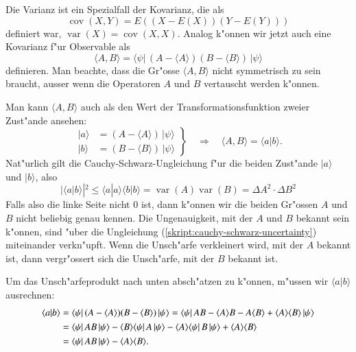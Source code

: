 Die Varianz ist ein Spezialfall der Kovarianz, die als 
\[
\operatorname{cov}(X,Y)
=
E((X-E(X))(Y-E(Y)))
\]
definiert war, $\operatorname{var}(X)=\operatorname{cov}(X,X)$.
Analog k"onnen wir jetzt auch eine Kovarianz f"ur Observable als
\[
\langle A,B\rangle
=
\langle\psi|
\,
(A-\langle A\rangle)(B-\langle B\rangle)
\,
|\psi\rangle
\]
definieren.
Man beachte, dass die Gr"osse $\langle A,B\rangle$ nicht symmetrisch zu
sein braucht, ausser wenn die Operatoren $A$ und $B$ vertauscht werden
k"onnen.

Man kann $\langle A,B\rangle$ auch als den Wert der Transformationsfunktion 
zweier Zust"ande ansehen:
\begin{equation}
\left.
\begin{aligned}
|a\rangle &= (A-\langle A\rangle)\,|\psi\rangle\\
|b\rangle &= (B-\langle B\rangle)\,|\psi\rangle
\end{aligned}
\right\}
\quad
\Rightarrow
\quad
\langle A,B\rangle = \langle a|b\rangle.
\end{equation}
Nat"urlich gilt die Cauchy-Schwarz-Ungleichung f"ur die beiden
Zust"ande $|a\rangle$ und $|b\rangle$, also
\begin{equation}
|\langle a|b\rangle|^2
\le
\langle a|a\rangle \langle b|b\rangle
=
\operatorname{var}(A)\operatorname{var}(B)
=\Delta A^2 \cdot \Delta B^2
\label{skript:cauchy-schwarz-uncertainty}
\end{equation}
Falls also die linke Seite nicht $0$ ist, dann k"onnen wir die beiden
Gr"ossen $A$ und $B$ nicht beliebig genau kennen.
Die Ungenauigkeit, mit der $A$ und $B$ bekannt sein k"onnen, sind "uber
die Ungleichung (\ref{skript:cauchy-schwarz-uncertainty}) miteinander verkn"upft.
Wenn die Unsch"arfe verkleinert wird, mit der $A$ bekannt ist, dann 
vergr"ossert sich die Unsch"arfe, mit der $B$ bekannt ist.

Um das Unsch"arfeprodukt nach unten absch"atzen zu k"onnen, m"ussen
wir $\langle a|b\rangle$ ausrechnen:
\begin{align}
\langle a|b\rangle
&=
\langle\psi|\,
(A-\langle A\rangle)(B-\langle B\rangle)
\,|\psi\rangle
=
\langle\psi|\,
AB-\langle A\rangle B-A\langle B\rangle
+
\langle A\rangle\langle B\rangle
\,|\psi\rangle
\notag
\\
&=
\langle\psi|\,AB\,|\psi\rangle
-\langle B\rangle\langle\psi|\,A\,|\psi\rangle
-\langle A\rangle\langle\psi|\,B\,|\psi\rangle
+
\langle A\rangle\langle B\rangle
\notag
\\
&=
\langle\psi|\,AB\,|\psi\rangle
-
\langle A\rangle\langle B\rangle.
\label{skript:abausrechnung}
\end{align}

